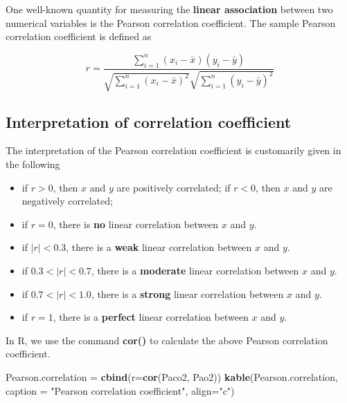 \documentclass[
]{book}
\newenvironment{Shaded}{\begin{snugshade}}{\end{snugshade}}
\newcommand{\AttributeTok}[1]{\textcolor[rgb]{0.13,0.29,0.53}{#1}}
\newcommand{\FunctionTok}[1]{\textcolor[rgb]{0.13,0.29,0.53}{\textbf{#1}}}
\newcommand{\NormalTok}[1]{#1}
\newcommand{\OtherTok}[1]{\textcolor[rgb]{0.56,0.35,0.01}{#1}}
\newcommand{\StringTok}[1]{\textcolor[rgb]{0.31,0.60,0.02}{#1}}
\begin{document}
One well-known quantity for measuring the \textbf{linear association} between two numerical variables is the Pearson correlation coefficient. The sample Pearson correlation coefficient is defined as

\[
r=\frac{\sum_{i=1}^n(x_i-\bar{x})(y_i-\bar{y})}{\sqrt{\sum_{i=1}^n(x_i-\bar{x})^2}\sqrt{\sum_{i=1}^n(y_i-\bar{y})^2}}
\]

\hypertarget{interpretation-of-correlation-coefficient}{%
\subsection{Interpretation of correlation coefficient}\label{interpretation-of-correlation-coefficient}}

The interpretation of the Pearson correlation coefficient is customarily given in the following

\begin{itemize}
\item
  if \(r > 0\), then \(x\) and \(y\) are positively correlated; if \(r < 0\), then \(x\) and \(y\) are negatively correlated;
\item
  if \(r = 0\), there is \textbf{no} linear correlation between \(x\) and \(y\).
\item
  if \(|r| < 0.3\), there is a \textbf{weak} linear correlation between \(x\) and \(y\).
\item
  if \(0.3< |r| < 0.7\), there is a \textbf{moderate} linear correlation between \(x\) and \(y\).
\item
  if \(0.7 < |r| < 1.0\), there is a \textbf{strong} linear correlation between \(x\) and \(y\).
\item
  if \(r = 1\), there is a \textbf{perfect} linear correlation between \(x\) and \(y\).
\end{itemize}

In R, we use the command \textbf{cor()} to calculate the above Pearson correlation coefficient.

\begin{Shaded}
\begin{Highlighting}[]
\NormalTok{Pearson.correlation }\OtherTok{=} \FunctionTok{cbind}\NormalTok{(}\AttributeTok{r=}\FunctionTok{cor}\NormalTok{(Paco2, Pao2))}
\FunctionTok{kable}\NormalTok{(Pearson.correlation, }\AttributeTok{caption =} \StringTok{"Pearson correlation coefficient"}\NormalTok{,}
      \AttributeTok{align=}\StringTok{"c"}\NormalTok{)}
\end{Highlighting}
\end{Shaded}
\end{document}
